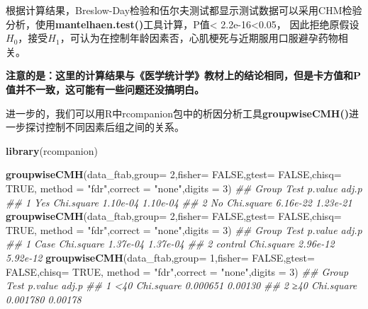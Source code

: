 \documentclass[
]{article}
\newenvironment{Shaded}{\begin{snugshade}}{\end{snugshade}}
\newcommand{\CommentTok}[1]{\textcolor[rgb]{0.56,0.35,0.01}{\textit{#1}}}
\newcommand{\DataTypeTok}[1]{\textcolor[rgb]{0.13,0.29,0.53}{#1}}
\newcommand{\DecValTok}[1]{\textcolor[rgb]{0.00,0.00,0.81}{#1}}
\newcommand{\KeywordTok}[1]{\textcolor[rgb]{0.13,0.29,0.53}{\textbf{#1}}}
\newcommand{\NormalTok}[1]{#1}
\newcommand{\OtherTok}[1]{\textcolor[rgb]{0.56,0.35,0.01}{#1}}
\newcommand{\StringTok}[1]{\textcolor[rgb]{0.31,0.60,0.02}{#1}}
\begin{document}
根据计算结果，Breslow-Day检验和伍尔夫测试都显示测试数据可以采用CHM检验分析，使用\textbf{mantelhaen.test()}工具计算，P值\textless{} 2.2e-16\textless0.05，
因此拒绝原假设\(H_0\)，接受\(H_1\)，可认为在控制年龄因素否，心肌梗死与近期服用口服避孕药物相关。

\textbf{注意的是：这里的计算结果与《医学统计学》教材上的结论相同，但是卡方值和P值并不一致，这可能有一些问题还没搞明白。}

进一步的，我们可以用R中rcompanion包中的析因分析工具\textbf{groupwiseCMH()}进一步探讨控制不同因素后组之间的关系。

\begin{Shaded}
\begin{Highlighting}[]
\KeywordTok{library}\NormalTok{(rcompanion)}

\KeywordTok{groupwiseCMH}\NormalTok{(data_ftab,}\DataTypeTok{group=} \DecValTok{2}\NormalTok{,}\DataTypeTok{fisher=} \OtherTok{FALSE}\NormalTok{,}\DataTypeTok{gtest=} \OtherTok{FALSE}\NormalTok{,}\DataTypeTok{chisq=} \OtherTok{TRUE}\NormalTok{,}
              \DataTypeTok{method =} \StringTok{"fdr"}\NormalTok{,}\DataTypeTok{correct =} \StringTok{"none"}\NormalTok{,}\DataTypeTok{digits  =} \DecValTok{3}\NormalTok{)}
\CommentTok{##   Group       Test  p.value    adj.p}
\CommentTok{## 1   Yes Chi.square 1.10e-04 1.10e-04}
\CommentTok{## 2    No Chi.square 6.16e-22 1.23e-21}
\KeywordTok{groupwiseCMH}\NormalTok{(data_ftab,}\DataTypeTok{group=} \DecValTok{2}\NormalTok{,}\DataTypeTok{fisher=} \OtherTok{FALSE}\NormalTok{,}\DataTypeTok{gtest=} \OtherTok{FALSE}\NormalTok{,}\DataTypeTok{chisq=} \OtherTok{TRUE}\NormalTok{,}
              \DataTypeTok{method =} \StringTok{"fdr"}\NormalTok{,}\DataTypeTok{correct =} \StringTok{"none"}\NormalTok{,}\DataTypeTok{digits  =} \DecValTok{3}\NormalTok{)}
\CommentTok{##     Group       Test  p.value    adj.p}
\CommentTok{## 1    Case Chi.square 1.37e-04 1.37e-04}
\CommentTok{## 2 contral Chi.square 2.96e-12 5.92e-12}
\KeywordTok{groupwiseCMH}\NormalTok{(data_ftab,}\DataTypeTok{group=} \DecValTok{1}\NormalTok{,}\DataTypeTok{fisher=} \OtherTok{FALSE}\NormalTok{,}\DataTypeTok{gtest=} \OtherTok{FALSE}\NormalTok{,}\DataTypeTok{chisq=} \OtherTok{TRUE}\NormalTok{,}
              \DataTypeTok{method =} \StringTok{"fdr"}\NormalTok{,}\DataTypeTok{correct =} \StringTok{"none"}\NormalTok{,}\DataTypeTok{digits  =} \DecValTok{3}\NormalTok{)}
\CommentTok{##   Group       Test  p.value   adj.p}
\CommentTok{## 1   <40 Chi.square 0.000651 0.00130}
\CommentTok{## 2   ≥40 Chi.square 0.001780 0.00178}
\end{Highlighting}
\end{Shaded}
\end{document}
